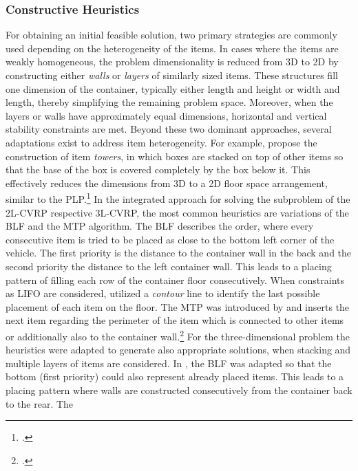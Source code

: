 \subsubsection{Constructive Heuristics}
For obtaining an initial feasible solution, two primary strategies are commonly
used depending on the heterogeneity of the items. In cases where the items are weakly homogeneous,
the problem dimensionality is reduced from 3D to 2D by constructing either
\textit{walls} or \textit{layers} of similarly sized items. These structures fill one
dimension of the container, typically either length and height or width and length, thereby
simplifying the remaining problem space. Moreover, when the layers or walls have approximately
equal dimensions, horizontal and vertical stability constraints are met.
Beyond these two dominant approaches, several adaptations exist to address item heterogeneity.
For example, \textcite{gehring_genetic_1997} propose the construction of item
\textit{towers}, in which boxes are stacked on top of other items so that the base of the box is covered completely
by the box below it. This effectively reduces the dimensions from 3D to a 2D floor space arrangement,
similar to the \gls{PLP}.\footcite[cf.][pp. 402--406]{gehring_genetic_1997}
In the integrated approach for solving the subproblem of the \gls{2L-CVRP} respective \gls{3L-CVRP},
the most common heuristics are variations of the \gls{BLF}
and the \gls{MTP} algorithm. The \gls{BLF} describes the order, where
every consecutive item is tried to be placed as close to the bottom left corner of the vehicle. The
first priority is the distance to the container wall in the back and the second priority the distance
to the left container wall. This leads to a placing pattern of filling each row of the container floor
consecutively.
When constraints as \gls{LIFO} are considered, \cite{iori_exact_2007} utilized a \textit{contour} line
to identify the last possible placement of each item on the floor. The \gls{MTP} was introduced by
\cite{zachariadis_guided_2009} and inserts the next item regarding the perimeter of the item which is connected
to other items or additionally also to the container wall.\footcite[cf.][p.732f]{zachariadis_guided_2009}
For the three-dimensional problem the heuristics were adapted to generate also appropriate solutions, when
stacking and multiple layers of items are considered. In \cite{gendreau_tabu_2006}, the \gls{BLF} was
adapted so that the bottom (first priority) could also represent already placed items. This leads
to a placing pattern where walls are constructed consecutively from the container back to the rear. The
